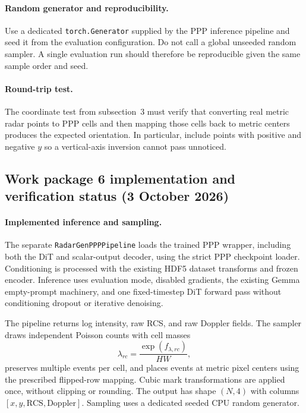 \documentclass[11pt,a4paper]{article}
\begin{document}
\paragraph{Random generator and reproducibility.}
Use a dedicated \texttt{torch.Generator} supplied by the PPP inference pipeline and seed it from the evaluation configuration. Do not call a global unseeded random sampler. A single evaluation run should therefore be reproducible given the same sample order and seed.

\paragraph{Round-trip test.}
The coordinate test from subsection~3 must verify that converting real metric radar points to PPP cells and then mapping those cells back to metric centers produces the expected orientation. In particular, include points with positive and negative \(y\) so a vertical-axis inversion cannot pass unnoticed.

\subsection*{Work package 6 implementation and verification status
(3 October 2026)}

\paragraph{Implemented inference and sampling.}
The separate \texttt{RadarGenPPPPipeline} loads the trained PPP
wrapper, including both the DiT and scalar-output decoder, using
the strict PPP checkpoint loader. Conditioning is processed with
the existing HDF5 dataset transforms and frozen encoder.
Inference uses evaluation mode, disabled gradients, the existing
Gemma empty-prompt machinery, and one fixed-timestep DiT forward
pass without conditioning dropout or iterative denoising.

The pipeline returns log intensity, raw RCS, and raw Doppler fields.
The sampler draws independent Poisson counts with cell masses
\[
    \lambda_{rc}=\frac{\exp(f_{\lambda,rc})}{HW},
\]
preserves multiple events per cell, and places events at metric
pixel centers using the prescribed flipped-row mapping.
Cubic mark transformations are applied once, without clipping or
rounding. The output has shape $(N,4)$ with columns
$[x,y,\mathrm{RCS},\mathrm{Doppler}]$.
Sampling uses a dedicated seeded CPU random generator.
\end{document}
